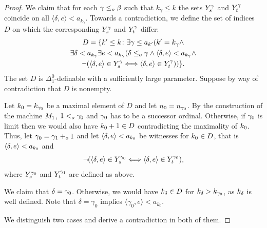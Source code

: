 \documentclass[10pt,a4paper]{amsart}
\newcommand{\andrea}[1]{\textcolor{green}{#1}}
\def\ifff{\Longleftrightarrow}
\def\la{\langle}
\newcommand{\leo}{<\sb{o}}
\newcommand{\leqo}{\leq\sb{o}}
\newcommand{\lorenzo}[1]{\textcolor{blue}{#1}}
\newcommand{\pluso}{+\sb{o}}
\def\ra{\rangle}
\begin{document}
\begin{proof}
We claim that for each $\gamma \leqo \beta$ such that $k_\gamma \leq k$ the sets $Y\sp {\gamma}\sb{s}$ and $Y\sp{\gamma}\sb{t}$ coincide on all $\langle \delta, e\rangle < a_{k_\gamma}$.
Towards a contradiction, we define the set of indices $D$ on which the corresponding $Y\sp {\gamma}\sb{s}$ and $Y\sp{\gamma}\sb{t}$ differ:
\begin{multline*}
D=\{k'\leq k\colon \exists \gamma\leq a\sb{k'} 
(k'=k\sb\gamma  \land  \\
\exists \delta<a\sb{k\sb\gamma}\exists e<a\sb{k\sb\gamma}(\delta\leqo\gamma\land
\la\delta,e\ra<a\sb {k\sb\gamma} \land  \\
\neg(\la\delta,e\ra\in Y\sp{\gamma}\sb{s} \ifff \la\delta,e\ra\in Y\sp{\gamma}\sb{t}))\}.
\end{multline*}
The set $D$ is $\Delta^0_1$-definable with a sufficiently large parameter. Suppose by way of contradiction that $D$ is nonempty.

Let $k\sb0=k\sb{\gamma\sb0}$ be a maximal element of $D$ and let $n\sb0=n\sb{\gamma\sb0}$.
By the construction of the machine $M\sb{1}$,  $1\leo \gamma\sb0$ and $\gamma\sb0$ has to be a successor ordinal.
Otherwise, if $\gamma\sb0$ is limit then we would also have $k\sb0+1\in D$ contradicting the maximality of $k\sb0$. 
Thus, let $\gamma\sb0=\gamma\sb 1\pluso 1$ and let $\la\delta,e\ra<a\sb{k\sb0}$ be witnesses for $k\sb0\in D$, that is $\la\delta,e\ra<a\sb{k\sb0}$ and 
$$
\neg(\la\delta,e\ra\in Y\sp{\gamma\sb0}\sb{s} \ifff \la\delta,e\ra\in Y\sp{\gamma\sb0}\sb{t}),
$$
where $Y\sp{\gamma\sb 0}\sb{s}$ and $Y\sp{\gamma\sb 1}\sb{t}$ are defined as above. 

We claim that $\delta=\gamma\sb0$. 
Otherwise, we would have $k\sb{\delta}\in D$ for $k\sb\delta>k\sb{\gamma\sb0}$, as $k\sb\delta$ is well defined. Note that $\delta = \gamma_0$ implies $\langle \gamma_0, e\rangle < a_{k_0}$.

We distinguish two cases and derive a contradiction in both of them. 



\smallskip


\end{proof}
\end{document}
